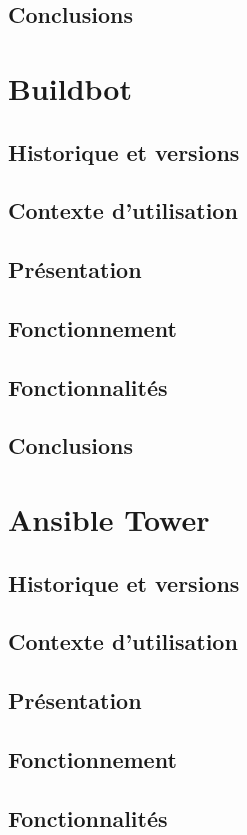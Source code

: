 \documentclass[12pt]{article}
\begin{document}
\subsection{Conclusions}

\section{Buildbot}
\subsection{Historique et versions}
\subsection{Contexte d'utilisation}
\subsection{Présentation}
\subsection{Fonctionnement}
\subsection{Fonctionnalités}
\subsection{Conclusions}

\section{Ansible Tower}
\subsection{Historique et versions}
\subsection{Contexte d'utilisation}
\subsection{Présentation}
\subsection{Fonctionnement}
\subsection{Fonctionnalités}
\end{document}
